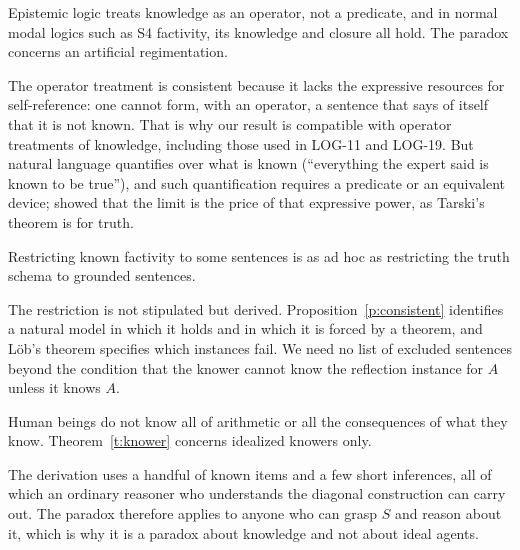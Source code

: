 \documentclass{situationist-preprint}
\begin{document}
\begin{objection}
Epistemic logic treats knowledge as an operator, not a predicate, and in normal modal logics such as S4 factivity, its knowledge and closure all hold. The paradox concerns an artificial regimentation.
\end{objection}

\begin{reply}
The operator treatment is consistent because it lacks the expressive resources for self-reference: one cannot form, with an operator, a sentence that says of itself that it is not known. That is why our result is compatible with operator treatments of knowledge, including those used in LOG-11 and LOG-19. But natural language quantifies over what is known (\enquote{everything the expert said is known to be true}), and such quantification requires a predicate or an equivalent device; \citet{Montague1963} showed that the limit is the price of that expressive power, as Tarski's theorem is for truth.
\end{reply}

\begin{objection}
Restricting known factivity to some sentences is as ad hoc as restricting the truth schema to grounded sentences.
\end{objection}

\begin{reply}
The restriction is not stipulated but derived. Proposition~\ref{p:consistent} identifies a natural model in which it holds and in which it is forced by a theorem, and Löb's theorem specifies which instances fail. We need no list of excluded sentences beyond the condition that the knower cannot know the reflection instance for $A$ unless it knows $A$.
\end{reply}

\begin{objection}
Human beings do not know all of arithmetic or all the consequences of what they know. Theorem~\ref{t:knower} concerns idealized knowers only.
\end{objection}

\begin{reply}
The derivation uses a handful of known items and a few short inferences, all of which an ordinary reasoner who understands the diagonal construction can carry out. The paradox therefore applies to anyone who can grasp $S$ and reason about it, which is why it is a paradox about knowledge and not about ideal agents.
\end{reply}
\end{document}
